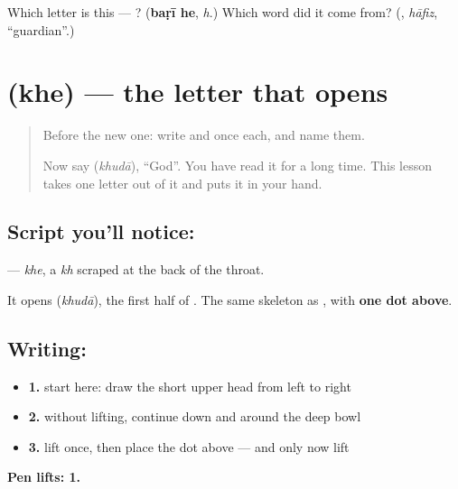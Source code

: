 \begin{tcolorbox}[breakable,colback=teal!4,colframe=teal!35!black,title={Before you move on}]
Which letter is this — ? (\textbf{baṛī he}, \emph{h}.) Which word did it come from? (\textbf{}, \emph{hāfiz}, \textquotedblleft{}guardian\textquotedblright{}.)
\end{tcolorbox}
\section[\texorpdfstring{\ur{خ} (khe)}{خ (khe)}]{ (khe) — the letter that opens }

\label{lesson:UR-W35-khe}



\begin{quote}
Before the new one: write  and  once each, and name them.

Now say \textbf{} (\emph{khudā}), \textquotedblleft{}God\textquotedblright{}. You have read it for a long time. This lesson takes one letter out of it and puts it in your hand.
\end{quote}

\subsection*{Script you'll notice: }
\textbf{} — \emph{khe}, a \emph{kh} scraped at the back of the throat.

It opens \textbf{} (\emph{khudā}), the first half of \textbf{ }. The same skeleton as \textbf{}, with \textbf{one dot above}.

\subsection*{Writing: }

\begin{itemize}
\raggedright
  \item \textbf{1.} start here: draw the short upper head from left to right
  \item \textbf{2.} without lifting, continue down and around the deep bowl
  \item \textbf{3.} lift once, then place the dot above — and only now lift
\end{itemize}

\textbf{Pen lifts: 1.}

